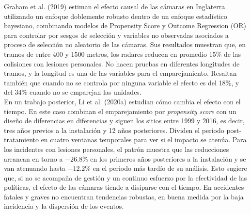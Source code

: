 Graham et al. (2019) estiman el efecto causal de las cámaras en Inglaterra utilizando un enfoque doblemente robusto dentro de un enfoque estadístico bayesiano, combinando modelos de Propensity Score y Outcome Regression (OR) para controlar por sesgos de selección y variables no observadas asociados a proceso de selección no aleatorio de las cámaras. Sus resultados muestran que, en tramos de entre 400 y 1500 metros, los radares reducen en promedio 15\% de las colisiones con lesiones personales. No hacen pruebas en diferentes longitudes de tramos, y la longitud es una de las variables para el emparejamiento. Resaltan también que cuando no se controla por ninguna variable el efecto es del 18\%, y del 34\% cuando no se emparejan las unidades.\\ 

En un trabajo posterior, Li et al. (2020a) estudian cómo cambia el efecto con el tiempo. En este caso combinan el emparejamiento por \emph{propensity score} con un diseño de diferencias en diferencias y siguen los sitios entre 1999 y 2016, es decir, tres años previos a la instalación y 12 años posteriores. Dividen el periodo post-tratamiento en cuatro ventanas temporales para ver si el impacto se atenúa. Para los incidentes con lesiones personales, el patrón muestra que las reducciones arrancan en torno a $-26.8$\% en los primeros años posteriores a la instalación y se van atenuando hasta $-12.2$\% en el periodo más tardío de su análisis. Esto sugiere que, si no se acompaña de gestión y un continuo esfuerzo por la efectividad de las políticas, el efecto de las cámaras tiende a disiparse con el tiempo. En accidentes fatales y graves no encuentran tendencias robustas, en buena medida por la baja incidencia y la dispersión de los eventos.\\ 

